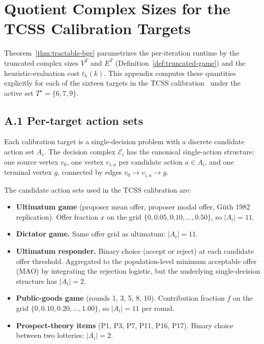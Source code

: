 \documentclass[11pt]{article}
\theoremstyle{definition}
\theoremstyle{remark}
\newcommand{\E}{\mathcal{E}}
\begin{document}
\appendix
\section{Quotient Complex Sizes for the TCSS Calibration Targets}
\label{app:vt-et}

Theorem~\ref{thm:tractable-bge} parametrizes the per-iteration runtime by the truncated complex
sizes $V^T$ and $E^T$ (Definition~\ref{def:truncated-game}) and the heuristic-evaluation cost
$t_h(k)$. This appendix computes these quantities explicitly for each of the sixteen targets in the
TCSS calibration~\cite{bond2026tcss} under the active set $T^\star = \{6, 7, 9\}$.

\subsection*{A.1 Per-target action sets}

Each calibration target is a single-decision problem with a discrete candidate action set
$A_i$. The decision complex $\E_i$ has the canonical single-action structure: one source vertex
$v_0$, one vertex $v_{i,a}$ per candidate action $a \in A_i$, and one terminal vertex $g$,
connected by edges $v_0 \to v_{i,a} \to g$.

The candidate action sets used in the TCSS calibration are:
\begin{itemize}
\item \textbf{Ultimatum game} (proposer mean offer, proposer modal offer, G\"uth 1982 replication).
Offer fraction $x$ on the grid $\{0, 0.05, 0.10, \ldots, 0.50\}$, so $|A_i| = 11$.
\item \textbf{Dictator game.} Same offer grid as ultimatum: $|A_i| = 11$.
\item \textbf{Ultimatum responder.} Binary choice (accept or reject) at each candidate offer
threshold. Aggregated to the population-level minimum acceptable offer (MAO) by integrating the
rejection logistic, but the underlying single-decision structure has $|A_i| = 2$.
\item \textbf{Public-goods game} (rounds 1, 3, 5, 8, 10). Contribution fraction $f$ on the grid
$\{0, 0.10, 0.20, \ldots, 1.00\}$, so $|A_i| = 11$ per round.
\item \textbf{Prospect-theory items} (P1, P3, P7, P11, P16, P17). Binary choice between two
lotteries: $|A_i| = 2$.
\end{itemize}
\end{document}

